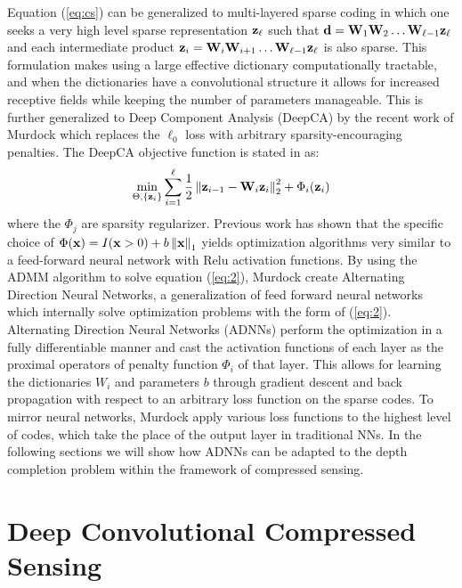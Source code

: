 Equation (\ref{eq:cs}) can be generalized to multi-layered sparse coding in which one seeks a very high level sparse representation $\mathbf{z}_{\ell}$ such that $\mathbf{d} = \mathbf{W}_1\mathbf{W}_2\ldots \mathbf{W}_{\ell-1}\mathbf{z}_{\ell}$ and each intermediate product $\mathbf{z}_i = \mathbf{W}_i\mathbf{W}_{i+1}\ldots \mathbf{W}_{\ell-1}\mathbf{z}_{\ell}$ is also sparse. This formulation makes using a large effective dictionary computationally tractable, and when the dictionaries have a convolutional structure it allows for increased receptive fields while keeping the number of parameters manageable. This is further generalized to Deep Component Analysis (DeepCA) by the recent work of Murdock \etal which replaces the $\ell_0$ loss with arbitrary sparsity-encouraging penalties. The DeepCA objective function is stated in \cite{murdock} as:
\begin{equation}
  \label{eq:2}
  \min_{\Theta, \{\mathbf{z}_i\}} \sum_{i=1}^{\ell} \frac{1}{2} \left\Vert \mathbf{z}_{i-1} - \mathbf{W}_i\mathbf{z}_i\right\Vert_2^2 + \Phi_i(\mathbf{z}_i)
\end{equation}
where the $\Phi_j$ are sparsity regularizer. Previous work has shown that the specific choice of $\Phi(\mathbf{x}) = I(\mathbf{x} > 0) + b\left\Vert\mathbf{x}\right\Vert_1$ yields optimization algorithms very similar to a feed-forward neural network with Relu activation functions. By using the ADMM algorithm to solve equation (\ref{eq:2}), Murdock \etal create Alternating Direction Neural Networks, a generalization of feed forward neural networks which internally solve optimization problems with the form of (\ref{eq:2}). Alternating Direction Neural Networks (ADNNs) perform the optimization in a fully differentiable manner and cast the activation functions of each layer as the proximal operators of penalty function $\Phi_i$ of that layer. This allows for learning the dictionaries $W_i$ and parameters $b$ through gradient descent and back propagation with respect to an arbitrary loss function on the sparse codes. To mirror neural networks, Murdock \etal apply various loss functions to the highest level of codes, which take the place of the output layer in traditional NNs. In the following sections we will show how ADNNs can be adapted to the depth completion problem within the framework of compressed sensing.\\

\section{Deep Convolutional Compressed Sensing}
\label{sec:dccs}


